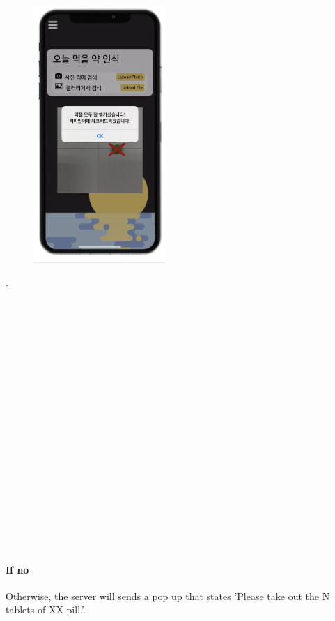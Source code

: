 \documentclass[conference]{IEEEtran}
\begin{document}
\begin{figure}[h!]
\centering
\includegraphics[width=5cm]{final_image_folder/today_result2.png}
\caption{}
\label{fig:map}
\end{figure}
.\\
\\
\\
\\
\\
\\
\\
\\
\\
\\
\\
\\
\\
\\
\\
\\
\\
\\
\\
\\

\paragraph{If no}  Otherwise, the server will sends a pop up that states 'Please take out the N tablets of XX pill.'.\\
\end{document}
